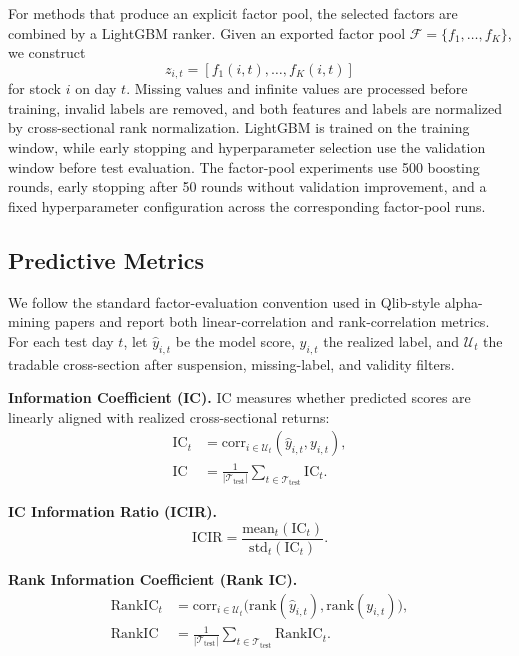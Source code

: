 For methods that produce an explicit factor pool, the selected factors are combined by a LightGBM ranker. Given an exported factor pool \(\mathcal{F}=\{f_1,\ldots,f_K\}\), we construct
\begin{equation}
z_{i,t}=[f_1(i,t),\ldots,f_K(i,t)]
\end{equation}
for stock \(i\) on day \(t\). Missing values and infinite values are processed before training, invalid labels are removed, and both features and labels are normalized by cross-sectional rank normalization. LightGBM is trained on the training window, while early stopping and hyperparameter selection use the validation window before test evaluation. The factor-pool experiments use 500 boosting rounds, early stopping after 50 rounds without validation improvement, and a fixed hyperparameter configuration across the corresponding factor-pool runs.

\subsection{Predictive Metrics}

We follow the standard factor-evaluation convention used in Qlib-style alpha-mining papers and report both linear-correlation and rank-correlation metrics. For each test day \(t\), let \(\hat y_{i,t}\) be the model score, \(y_{i,t}\) the realized label, and \(\mathcal{U}_t\) the tradable cross-section after suspension, missing-label, and validity filters.

\textbf{Information Coefficient (IC).}
IC measures whether predicted scores are linearly aligned with realized cross-sectional returns:
\begin{equation}
\begin{aligned}
\mathrm{IC}_t
&=\mathrm{corr}_{i\in\mathcal{U}_t}(\hat y_{i,t},y_{i,t}),\\
\mathrm{IC}
&=\frac{1}{|\mathcal{T}_{\mathrm{test}}|}
  \sum_{t\in\mathcal{T}_{\mathrm{test}}}\mathrm{IC}_t .
\end{aligned}
\end{equation}

\textbf{IC Information Ratio (ICIR).}
\begin{equation}
\mathrm{ICIR}=\frac{\mathrm{mean}_{t}(\mathrm{IC}_t)}{\mathrm{std}_{t}(\mathrm{IC}_t)}.
\end{equation}

\textbf{Rank Information Coefficient (Rank IC).}
\begin{equation}
\begin{aligned}
\mathrm{RankIC}_t
&=\mathrm{corr}_{i\in\mathcal{U}_t}
  \bigl(\mathrm{rank}(\hat y_{i,t}),\mathrm{rank}(y_{i,t})\bigr),\\
\mathrm{RankIC}
&=\frac{1}{|\mathcal{T}_{\mathrm{test}}|}
  \sum_{t\in\mathcal{T}_{\mathrm{test}}}\mathrm{RankIC}_t .
\end{aligned}
\end{equation}

